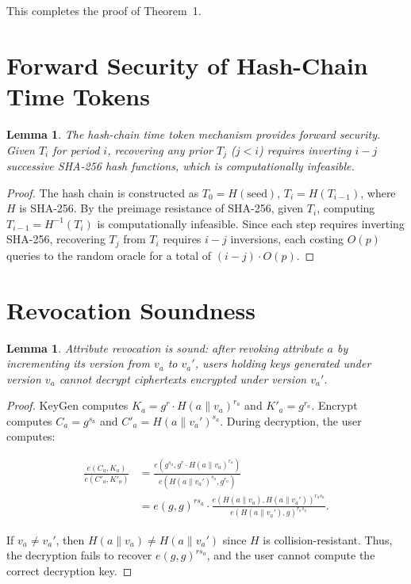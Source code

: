 \documentclass[lettersize,journal]{IEEEtran}
\newtheorem{lemma}[theorem]{Lemma}
\begin{document}
This completes the proof of Theorem~1.

\section{Forward Security of Hash-Chain Time Tokens}
\label{sec:forward_security}

\begin{lemma}
\label{lem:forward_security}
The hash-chain time token mechanism provides forward security. Given $T_i$ for period $i$, recovering any prior $T_j$ ($j < i$) requires inverting $i-j$ successive SHA-256 hash functions, which is computationally infeasible.
\end{lemma}

\begin{proof}
The hash chain is constructed as $T_0 = H(\text{seed})$, $T_i = H(T_{i-1})$, where $H$ is SHA-256. By the preimage resistance of SHA-256, given $T_i$, computing $T_{i-1} = H^{-1}(T_i)$ is computationally infeasible. Since each step requires inverting SHA-256, recovering $T_j$ from $T_i$ requires $i-j$ inversions, each costing $O(p)$ queries to the random oracle for a total of $(i-j) \cdot O(p)$.
\end{proof}

\section{Revocation Soundness}
\label{sec:revocation_soundness}

\begin{lemma}
\label{lem:revocation_soundness}
Attribute revocation is sound: after revoking attribute $a$ by incrementing its version from $v_a$ to $v_a'$, users holding keys generated under version $v_a$ cannot decrypt ciphertexts encrypted under version $v_a'$.
\end{lemma}

\begin{proof}
KeyGen computes $K_a = g^r \cdot H(a \| v_a)^{r_a}$ and $K'_a = g^{r_a}$. Encrypt computes $C_a = g^{s_a}$ and $C'_a = H(a \| v_a')^{s_a}$. During decryption, the user computes:

\begin{equation}
\begin{split}
\frac{e(C_a, K_a)}{e(C'_a, K'_a)} &= \frac{e(g^{s_a}, g^r \cdot H(a \| v_a)^{r_a})}{e(H(a \| v_a')^{s_a}, g^{r_a})} \\
&= e(g,g)^{r s_a} \cdot \frac{e(H(a \| v_a), H(a \| v_a'))^{r_a s_a}}{e(H(a \| v_a'), g)^{r_a s_a}}.
\end{split}
\end{equation}

If $v_a \neq v_a'$, then $H(a \| v_a) \neq H(a \| v_a')$ since $H$ is collision-resistant. Thus, the decryption fails to recover $e(g,g)^{r s_a}$, and the user cannot compute the correct decryption key.
\end{proof}
\end{document}
